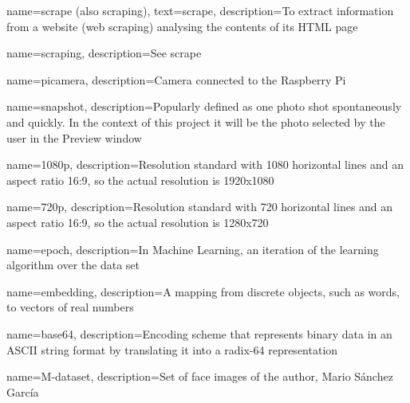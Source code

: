 
{
        name=scrape (\textmd{also} scraping),
        text=scrape,
        description={To extract information from a website (web scraping) analysing the contents of its HTML page}
}

{
        name=scraping,
        description={See \gls{scrape}}
}


{
        name=picamera,
        description={Camera connected to the Raspberry Pi}
}

{
        name=snapshot,
        description={Popularly defined as one photo shot spontaneously and quickly. In the context of this project it will be the photo selected by the user in the Preview window}
}

{
        name=1080p,
        description={Resolution standard with 1080 horizontal lines and an aspect ratio 16:9, so the actual resolution is 1920x1080}
}

{
        name=720p,
        description={Resolution standard with 720 horizontal lines and an aspect ratio 16:9, so the actual resolution is 1280x720}
}

{
        name=epoch,
        description={In Machine Learning, an iteration of the learning algorithm over the data set}
}


{
        name=embedding,
        description={A mapping from discrete objects, such as words, to vectors of real numbers}
}

{
        name=base64,
        description={Encoding scheme that represents binary data in an ASCII string format by translating it into a radix-64 representation}
}

{
        name=M-dataset,
        description={Set of face images of the author, Mario Sánchez García}
}
















